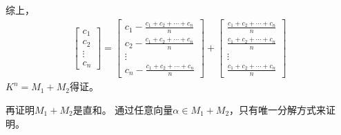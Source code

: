 \documentclass{article}
\begin{document}
\begin{itemize}
        综上，
        \begin{align*}
          \begin{bmatrix}
            c_1    \\
            c_2    \\
            \vdots \\
            c_n
          \end{bmatrix}
          = \begin{bmatrix}
              c_1 - \frac{c_1 + c_2 + \cdots + c_n}{n} \\
              c_2 - \frac{c_1 + c_2 + \cdots + c_n}{n} \\
              \vdots                                   \\
              c_n - \frac{c_1 + c_2 + \cdots + c_n}{n}
            \end{bmatrix}
          + \begin{bmatrix}
              \frac{c_1 + c_2 + \cdots + c_n}{n} \\
              \frac{c_1 + c_2 + \cdots + c_n}{n} \\
              \vdots                             \\
              \frac{c_1 + c_2 + \cdots + c_n}{n}
            \end{bmatrix}
        \end{align*}
        $K^n = M_1 + M_2$得证。

        再证明$M_1 + M_2$是直和。
        通过任意向量$\alpha \in M_1 + M_2$，只有唯一分解方式来证明。


\end{itemize}
\end{document}
